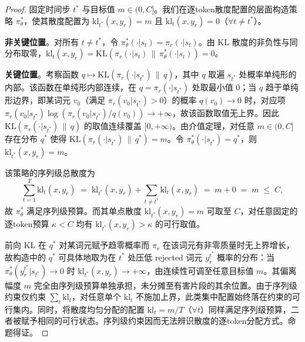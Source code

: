 \documentclass[lettersize,journal]{IEEEtran}
\begin{document}
\begin{proof}
固定时间步 $t^*$ 与目标值 $m \in (0, C]$。我们在逐token散度配置的层面构造策略 $\pi_\theta^*$，使其散度配置为 $\mathrm{kl}_{t^*}(x, y_r) = m$ 且 $\mathrm{kl}_t(x, y_r) = 0$（$\forall t \neq t^*$）。
 
\textbf{非关键位置}。对所有 $t \neq t^*$，令 $\pi_\theta^*(\cdot|s_t) = \pi_r(\cdot|s_t)$。由 KL 散度的非负性与同分布取零，$\mathrm{kl}_t(x, y_r) = \mathrm{KL}(\pi_r(\cdot|s_t) \,\|\, \pi_\theta^*(\cdot|s_t)) = 0$。
 
\textbf{关键位置}。考察函数 $q \mapsto \mathrm{KL}(\pi_r(\cdot|s_{t^*}) \,\|\, q)$，其中 $q$ 取遍 $s_{t^*}$ 处概率单纯形的内部。该函数在单纯形内部连续，在 $q = \pi_r(\cdot|s_{t^*})$ 处取最小值 $0$；当 $q$ 趋于单纯形边界，即某词元 $v_0$（满足 $\pi_r(v_0|s_{t^*}) > 0$）的概率 $q(v_0) \to 0$ 时，对应项 $\pi_r(v_0|s_{t^*})\log(\pi_r(v_0|s_{t^*})/q(v_0)) \to +\infty$，故该函数取值无上界。因此 $\mathrm{KL}(\pi_r(\cdot|s_{t^*}) \,\|\, q)$ 的取值连续覆盖 $[0, +\infty)$。由介值定理，对任意 $m \in (0, C]$ 存在分布 $q^*$ 使得 $\mathrm{KL}(\pi_r(\cdot|s_{t^*}) \,\|\, q^*) = m$。令 $\pi_\theta^*(\cdot|s_{t^*}) = q^*$，则 $\mathrm{kl}_{t^*}(x, y_r) = m$。
 
该策略的序列级总散度为
\begin{equation}
\sum_{t=1}^{T} \mathrm{kl}_t(x, y_r) \;=\; \mathrm{kl}_{t^*}(x, y_r) + \sum_{t \neq t^*} \mathrm{kl}_t(x, y_r) \;=\; m + 0 \;=\; m \;\le\; C,
\end{equation}
故 $\pi_\theta^*$ 满足序列级预算。而其单点散度 $\mathrm{kl}_{t^*}(x, y_r) = m$ 可取至 $C$，对任意固定的逐token预算 $\kappa < C$ 均有 $\mathrm{kl}_{t^*}(x, y_r) > \kappa$ 的可行取值。
 
前向 KL 在 $q^*$ 对某词元赋予趋零概率而 $\pi_r$ 在该词元有非零质量时无上界增长，故构造中的 $q^*$ 可具体地取为在 $t^*$ 处压低 rejected 词元 $y_r^{t^*}$ 概率的分布：当 $\pi_\theta^*(y_r^{t^*}|s_{t^*}) \to 0$ 时 $\mathrm{kl}_{t^*}(x, y_r) \to +\infty$，由连续性可调至任意目标值 $m$。其偏离幅度 $m$ 完全由序列级预算单独承担，未分摊至有害片段的其余位置。由于序列级约束仅约束 $\sum_t \mathrm{kl}_t$，对任意单个 $\mathrm{kl}_t$ 不施加上界，此类集中配置始终落在约束的可行集内。同时，将散度均匀分配的配置 $\mathrm{kl}_t = m/T$（$\forall t$）同样满足序列级预算，二者被赋予相同的可行状态。序列级约束因而无法辨识散度的逐token分配方式。命题得证。
\end{proof}
\end{document}
